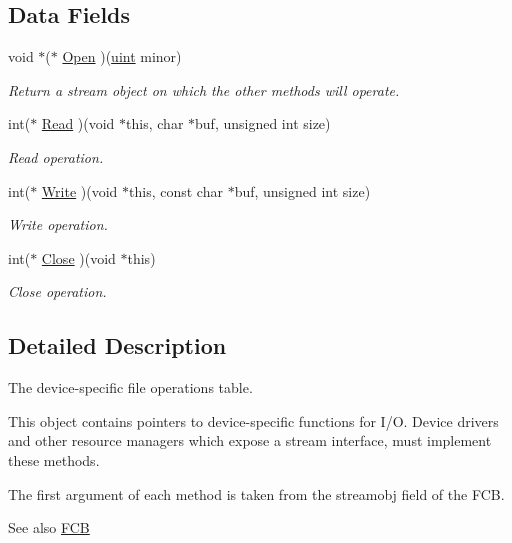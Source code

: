 \subsection*{Data Fields}
\begin{DoxyCompactItemize}
\item 
void $\ast$($\ast$ \hyperlink{structfile__operations_a2732da2af03e1fc7ba0b63a529ab1411}{Open} )(\hyperlink{bios_8h_a91ad9478d81a7aaf2593e8d9c3d06a14}{uint} minor)
\begin{DoxyCompactList}\small\item\em Return a stream object on which the other methods will operate. \end{DoxyCompactList}\item 
int($\ast$ \hyperlink{structfile__operations_a59d973a490a6861c498ac9cc9c32dbf5}{Read} )(void $\ast$this, char $\ast$buf, unsigned int size)
\begin{DoxyCompactList}\small\item\em Read operation. \end{DoxyCompactList}\item 
int($\ast$ \hyperlink{structfile__operations_a75d4020e8a146c1611dc40184d211ec6}{Write} )(void $\ast$this, const char $\ast$buf, unsigned int size)
\begin{DoxyCompactList}\small\item\em Write operation. \end{DoxyCompactList}\item 
int($\ast$ \hyperlink{structfile__operations_a66cfe706a1a29e3e58c7694dbd801b0f}{Close} )(void $\ast$this)
\begin{DoxyCompactList}\small\item\em Close operation. \end{DoxyCompactList}\end{DoxyCompactItemize}


\subsection{Detailed Description}
The device-\/specific file operations table. 

This object contains pointers to device-\/specific functions for I/O. Device drivers and other resource managers which expose a stream interface, must implement these methods.

The first argument of each method is taken from the \textquotesingle{}streamobj\textquotesingle{} field of the F\+CB. \begin{DoxySeeAlso}{See also}
\hyperlink{group__rlists_ga60c6c294fa1d8ea73ed270404fe5c17d}{F\+CB} 
\end{DoxySeeAlso}


